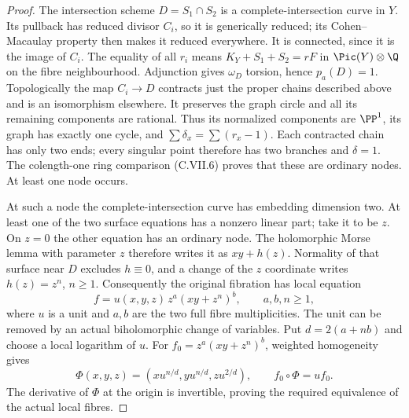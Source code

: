 \begin{proof}
The intersection scheme $D=S_1\cap S_2$ is a
complete-intersection curve in $Y$. Its pullback
has reduced divisor $C_i$, so it is generically
reduced; its Cohen--Macaulay property then makes
it reduced everywhere. It is connected, since it
is the image of $C_i$. The equality of all $r_i$
means $K_Y+S_1+S_2=rF$ in $\Pic(Y)\otimes\Q$
on the fibre neighbourhood. Adjunction gives
$\omega_D$ torsion, hence $p_a(D)=1$.
Topologically the map $C_i\to D$ contracts just
the proper chains described above and is an
isomorphism elsewhere. It preserves the graph
circle and all its remaining components are
rational. Thus its normalized components are
$\PP^1$, its graph has exactly one cycle, and
$\sum\delta_x=\sum(r_x-1)$. Each contracted
chain has only two ends; every singular point
therefore has two branches and $\delta=1$.
The colength-one ring comparison (C.VII.6)
proves that these are ordinary nodes. At least
one node occurs.

At such a node the complete-intersection curve
has embedding dimension two. At least one of
the two surface equations has a nonzero linear
part; take it to be $z$. On $z=0$ the other
equation has an ordinary node. The holomorphic
Morse lemma with parameter $z$ therefore writes
it as $xy+h(z)$. Normality of that surface near
$D$ excludes $h\equiv0$, and a change of the
$z$ coordinate writes $h(z)=z^n$, $n\ge1$.
Consequently the original fibration has local
equation
\[
 f=u(x,y,z)\,z^a(xy+z^n)^b,
 \qquad a,b,n\ge1,
 \tag{C.INT.11}\label{cdp:eq:C.INT.11}
\]
where $u$ is a unit and $a,b$ are the two full
fibre multiplicities. The unit can be removed
by an actual biholomorphic change of variables.
Put $d=2(a+nb)$ and choose a local logarithm of
$u$. For $f_0=z^a(xy+z^n)^b$, weighted homogeneity
gives
\[
 \Phi(x,y,z)=(x u^{n/d},y u^{n/d},z u^{2/d}),
 \qquad f_0\circ\Phi=u f_0.
 \tag{C.INT.12}\label{cdp:eq:C.INT.12}
\]
The derivative of $\Phi$ at the origin is
invertible, proving the required equivalence
of the actual local fibres.


\end{proof}
